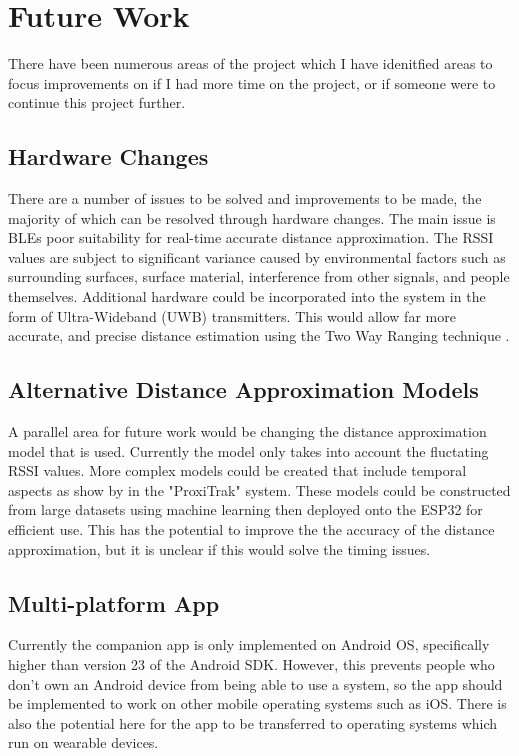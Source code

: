 \documentclass{l4proj}
\begin{document}
\section{Future Work}

There have been numerous areas of the project which I have idenitfied areas to focus improvements on if I had more time on the project, or if someone were to continue this project further.

\subsection{Hardware Changes}

There are a number of issues to be solved and improvements to be made, the majority of which can be resolved through hardware changes. The main issue is BLEs poor suitability for real-time accurate distance approximation. The RSSI values are subject to significant variance caused by environmental factors such as surrounding surfaces, surface material, interference from other signals, and people themselves. Additional hardware could be incorporated into the system in the form of Ultra-Wideband (UWB) transmitters. This would allow far more accurate, and precise distance estimation using the Two Way Ranging technique \citep{inpixon_ultra_wideband_2021}.

\subsection{Alternative Distance Approximation Models}

A parallel area for future work would be changing the distance approximation model that is used. Currently the model only takes into account the fluctating RSSI values. More complex models could be created that include temporal aspects as show by \citet{chandel_proxitrak_2020} in the "ProxiTrak" system. These models could be constructed from large datasets using machine learning then deployed onto the ESP32 for efficient use. This has the potential to improve the the accuracy of the distance approximation, but it is unclear if this would solve the timing issues.

\subsection{Multi-platform App}

Currently the companion app is only implemented on Android OS, specifically higher than version 23 of the Android SDK. However, this prevents people who don't own an Android device from being able to use a system, so the app should be implemented to work on other mobile operating systems such as iOS. There is also the potential here for the app to be transferred to operating systems which run on wearable devices.
\end{document}
